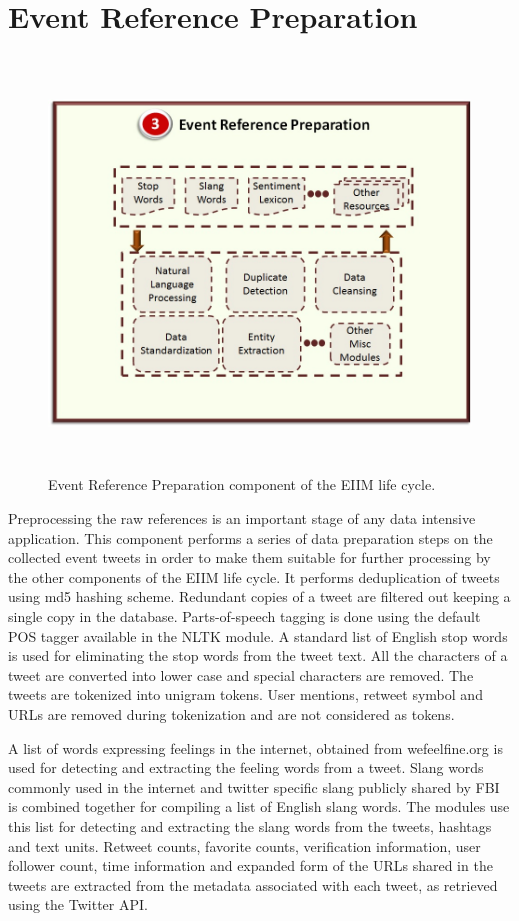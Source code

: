 \section{Event Reference Preparation}

\begin{figure}[htbp]
  \caption{Event Reference Preparation component of the EIIM life cycle.}
  \centering
    \includegraphics[width=14cm,height=11cm]{Figures/EIIMComponents/EventReferencePreparation.jpg}
\end{figure}

Preprocessing the raw references is an important stage of any data intensive application. This component performs a series of data preparation steps on the collected event tweets in order to make them suitable for further processing by the other components of the EIIM life cycle. It performs deduplication of tweets using md5 hashing scheme. Redundant copies of a tweet are filtered out keeping a single copy in the database. Parts-of-speech tagging is done using the default POS tagger available in the NLTK  module. A standard list of English stop words is used for eliminating the stop words from the tweet text. All the characters of a tweet are converted into lower case and special characters are removed. The tweets are tokenized into unigram tokens. User mentions, retweet symbol and URLs are removed during tokenization and are not considered as tokens.

A list of words expressing feelings in the internet, obtained from wefeelfine.org is used for detecting and extracting the feeling words from a tweet. Slang words commonly used in the internet and twitter specific slang publicly shared by FBI  is combined together for compiling a list of English slang words. The modules use this list for detecting and extracting the slang words from the tweets, hashtags and text units. Retweet counts, favorite counts, verification information, user follower count, time information and expanded form of the URLs shared in the tweets are extracted from the metadata associated with each tweet, as retrieved using the Twitter API. 


